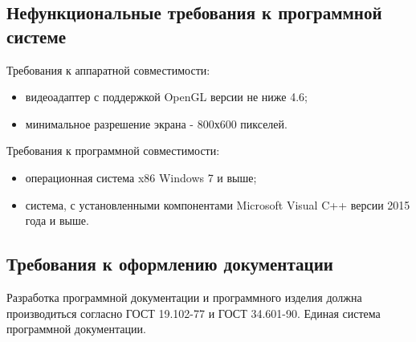 \subsection{Нефункциональные требования к программной системе}

Требования к аппаратной совместимости:
\begin{itemize}
	\item видеоадаптер с поддержкой OpenGL версии не ниже 4.6;
	\item минимальное разрешение экрана - 800х600 пикселей.
\end{itemize}

Требования к программной совместимости:
\begin{itemize}
	\item операционная система x86 Windows 7 и выше;
	\item система, с установленными компонентами Microsoft Visual C++ версии 2015 года и выше.
\end{itemize}

\subsection{Требования к оформлению документации}

Разработка программной документации и программного изделия должна производиться согласно ГОСТ 19.102-77 и ГОСТ 34.601-90. Единая система программной документации.

